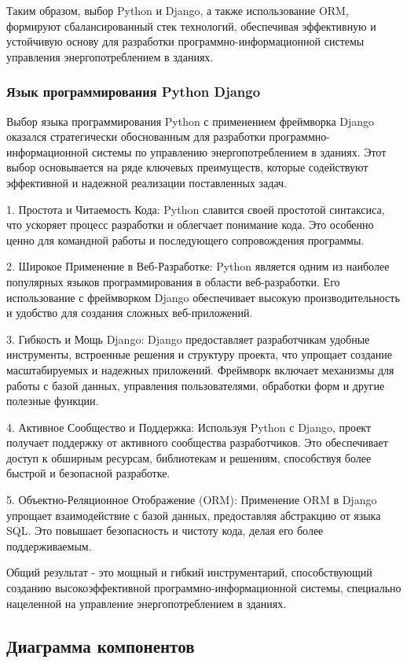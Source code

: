 Таким образом, выбор Python и Django, а также использование ORM, формируют сбалансированный стек технологий, обеспечивая эффективную и устойчивую основу для разработки программно-информационной системы управления энергопотреблением в зданиях.

\subsubsection{Язык программирования Python Django}

Выбор языка программирования Python с применением фреймворка Django оказался стратегически обоснованным для разработки программно-информационной системы по управлению энергопотреблением в зданиях. Этот выбор основывается на ряде ключевых преимуществ, которые содействуют эффективной и надежной реализации поставленных задач.

1. Простота и Читаемость Кода: Python славится своей простотой синтаксиса, что ускоряет процесс разработки и облегчает понимание кода. Это особенно ценно для командной работы и последующего сопровождения программы.

2. Широкое Применение в Веб-Разработке: Python является одним из наиболее популярных языков программирования в области веб-разработки. Его использование с фреймворком Django обеспечивает высокую производительность и удобство для создания сложных веб-приложений.

3. Гибкость и Мощь Django: Django предоставляет разработчикам удобные инструменты, встроенные решения и структуру проекта, что упрощает создание масштабируемых и надежных приложений. Фреймворк включает механизмы для работы с базой данных, управления пользователями, обработки форм и другие полезные функции.

4. Активное Сообщество и Поддержка: Используя Python с Django, проект получает поддержку от активного сообщества разработчиков. Это обеспечивает доступ к обширным ресурсам, библиотекам и решениям, способствуя более быстрой и безопасной разработке.

5. Объектно-Реляционное Отображение (ORM): Применение ORM в Django упрощает взаимодействие с базой данных, предоставляя абстракцию от языка SQL. Это повышает безопасность и чистоту кода, делая его более поддерживаемым.

Общий результат - это мощный и гибкий инструментарий, способствующий созданию высокоэффективной программно-информационной системы, специально нацеленной на управление энергопотреблением в зданиях.

\subsection{Диаграмма компонентов}

